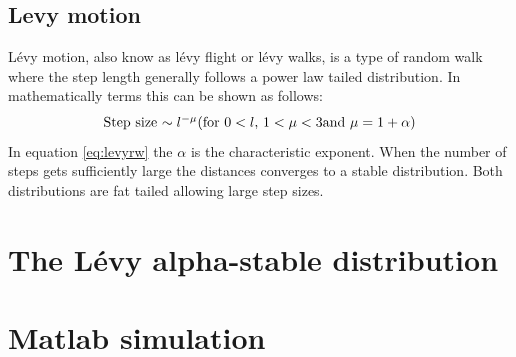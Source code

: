 \subsection{Levy motion}
Lévy motion, also know as lévy flight or lévy walks, is a type of random walk where the step length generally follows a power law tailed distribution. In mathematically terms this can be shown as follows:
\begin{equation}
$Step size $ \sim l ^{-\mu} ($for $ 0 < l $, $1 < \mu < 3$and $ \mu = 1 + \alpha)
\label{eq:levyrw}
\end{equation}
In equation \ref{eq:levyrw} the $\alpha$ is the characteristic exponent. When the number of steps gets sufficiently large the distances converges to a stable distribution. Both distributions are fat tailed allowing large step sizes.

\section{The Lévy alpha-stable distribution}

\section{Matlab simulation}